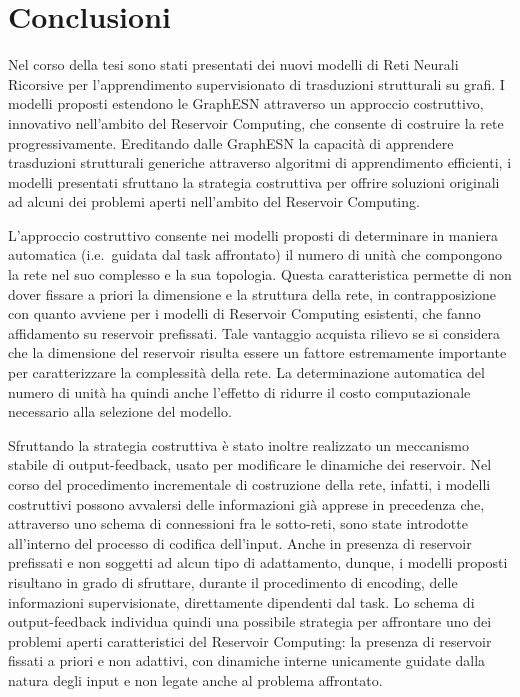 \chapter{Conclusioni}\label{ch:conclusioni}
Nel corso della tesi sono stati presentati dei nuovi modelli di Reti Neurali Ricorsive per l'apprendimento supervisionato di trasduzioni strutturali su grafi. 
I modelli proposti estendono le GraphESN attraverso un approccio costruttivo, innovativo nell'ambito del Reservoir Computing, che consente di costruire la rete progressivamente. Ereditando dalle GraphESN la capacità di apprendere trasduzioni strutturali generiche attraverso algoritmi di apprendimento efficienti, i modelli presentati sfruttano la strategia costruttiva per offrire soluzioni originali ad alcuni dei problemi aperti nell'ambito del Reservoir Computing. 

L'approccio costruttivo consente nei modelli proposti di determinare in maniera automatica (i.e.\ guidata dal task affrontato) il numero di unità che compongono la rete nel suo complesso e la sua topologia. Questa caratteristica permette di non dover fissare a priori la dimensione e la struttura della rete, in contrapposizione con quanto avviene per i modelli di Reservoir Computing esistenti, che fanno affidamento su reservoir prefissati. Tale vantaggio acquista rilievo se si considera che la dimensione del reservoir risulta essere un fattore estremamente importante per caratterizzare la complessità della rete. 
La determinazione automatica del numero di unità ha quindi anche l'effetto di ridurre il costo computazionale necessario alla selezione del modello.

Sfruttando la strategia costruttiva è stato inoltre realizzato un meccanismo stabile di output-feedback, usato per modificare le dinamiche dei reservoir. Nel corso del procedimento incrementale di costruzione della rete, infatti, i modelli costruttivi possono avvalersi delle informazioni già apprese in precedenza che, attraverso uno schema di connessioni fra le sotto-reti, sono state introdotte all'interno del processo di codifica dell'input.
Anche in presenza di reservoir prefissati e non soggetti ad alcun tipo di adattamento, dunque, i modelli proposti risultano in grado di sfruttare, durante il procedimento di encoding, delle informazioni supervisionate, direttamente dipendenti dal task.
Lo schema di output-feedback individua quindi una possibile strategia per affrontare uno dei problemi aperti caratteristici del Reservoir Computing: la presenza di reservoir fissati a priori e non adattivi, con dinamiche interne unicamente guidate dalla natura degli input e non legate anche al problema affrontato.

